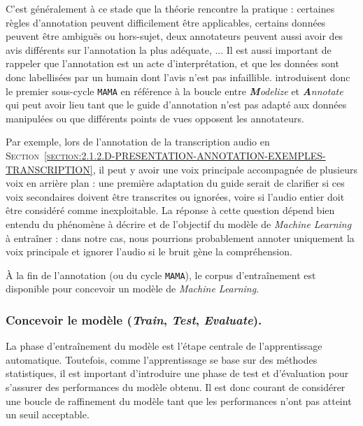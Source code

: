 			\begin{leftBarInformation}
				C'est généralement à ce stade que la théorie rencontre la pratique : certaines règles d'annotation peuvent difficilement être applicables, certains données peuvent être ambiguës ou hors-sujet, deux annotateurs peuvent aussi avoir des avis différents sur l'annotation la plus adéquate, ...
				Il est aussi important de rappeler que l’annotation est un acte d'interprétation, et que les données sont donc labellisées par un humain dont l'avis n'est pas infaillible. 
				\cite{pustejovsky-stubbs:2012:natural-language-annotation} introduisent donc le premier sous-cycle \texttt{MAMA} en référence à la boucle entre \textit{\textbf{M}odelize} et \textit{\textbf{A}nnotate} qui peut avoir lieu tant que le guide d'annotation n'est pas adapté aux données manipulées ou que différents points de vues opposent les annotateurs.
				
				Par exemple, lors de l'annotation de la transcription audio en \textsc{Section~\ref{section:2.1.2.D-PRESENTATION-ANNOTATION-EXEMPLES-TRANSCRIPTION}}, il peut y avoir une voix principale accompagnée de plusieurs voix en arrière plan : une première adaptation du guide serait de clarifier si ces voix secondaires doivent être transcrites ou ignorées, voire si l'audio entier doit être considéré comme inexploitable.
				La réponse à cette question dépend bien entendu du phénomène à décrire et de l'objectif du modèle de \textit{Machine Learning} à entraîner : dans notre cas, nous pourrions probablement annoter uniquement la voix principale et ignorer l'audio si le bruit gène la compréhension.
			\end{leftBarInformation}
			
			À la fin de l'annotation (ou du cycle \texttt{MAMA}), le corpus d'entraînement est disponible pour concevoir un modèle de \textit{Machine Learning}.
		
		
		\subsubsection{Concevoir le modèle (\textit{\textbf{T}rain}, \textit{\textbf{T}est}, \textit{\textbf{E}valuate}).}
		\label{section:2.2.1.B-ORGANISATION-ANNOTATION-ETAPES-CLES-TRAIN-TEST}
			
			La phase d'entraînement du modèle est l'étape centrale de l'apprentissage automatique.
			Toutefois, comme l'apprentissage se base sur des méthodes statistiques, il est important d'introduire une phase de test et d'évaluation pour s'assurer des performances du modèle obtenu.
			Il est donc courant de considérer une boucle de raffinement du modèle tant que les performances n'ont pas atteint un seuil acceptable.
			
